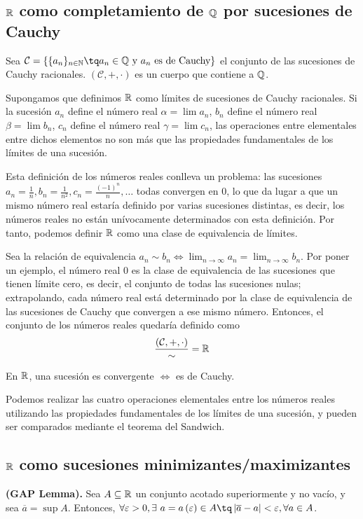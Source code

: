 {\subsection{$\mathbb{R}$ como completamiento de $\mathbb{Q}$ por sucesiones de Cauchy}
Sea $\mathcal{C} = \{\{a_n\}_{n\in\N}\tq a_n\in\Q \textrm{ y $a_n$ es de Cauchy} \}$ el conjunto de las sucesiones de Cauchy racionales. $\left(\mathcal{C}, +, \cdot\right)$ es un cuerpo que contiene a $\mathbb{Q}$.

Supongamos que definimos $\mathbb{R}$ como límites de sucesiones de Cauchy racionales. Si la sucesión $a_n$ define el número real $\alpha = \lim a_n$, $b_n$ define el número real $\beta = \lim b_n$, $c_n$ define el número real $\gamma = \lim c_n$, las operaciones entre elementales entre dichos elementos no son más que las propiedades fundamentales de los límites de una sucesión.

Esta definición de los números reales conlleva un problema: las sucesiones $a_n = \frac{1}{n}, b_n = \frac{1}{n^2}, c_n = \frac{\left(-1\right)^n}{n}, \ldots$ todas convergen en $0$, lo que da lugar a que un mismo número real estaría definido por varias sucesiones distintas, es decir, los números reales no están unívocamente determinados con esta definición. Por tanto, podemos definir $\mathbb{R}$ como una clase de equivalencia de límites.

Sea la relación de equivalencia $a_n\sim b_n \iff\lim_{n\to\infty}a_n = \lim_{n\to\infty}b_n$. Por poner un ejemplo, el número real $0$ es la clase de equivalencia de las sucesiones que tienen límite cero, es decir, el conjunto de todas las sucesiones nulas; extrapolando, cada número real está determinado por la clase de equivalencia de las sucesiones de Cauchy que convergen a ese mismo número. Entonces, el conjunto de los números reales quedaría definido como
\begin{equation}
    \frac{\left(\mathcal{C}, +, \cdot \right)}{\sim} = \mathbb{R}
\end{equation}

\begin{coro}
    En $\mathbb{R}$, una sucesión es convergente $\iff$ es de Cauchy.
\end{coro}

Podemos realizar las cuatro operaciones elementales entre los números reales utilizando las propiedades fundamentales de los límites de una sucesión, y pueden ser comparados mediante el teorema del Sandwich.

\subsection{$\mathbb{R}$ como sucesiones minimizantes/maximizantes}
\begin{lemma}
    \textbf{(GAP Lemma).} Sea $A\subseteq\mathbb{R}$ un conjunto acotado superiormente y no vacío, y sea $\overline{a} = \sup A$. Entonces, $\forall\epsilon > 0, \exists\ a = a\left( \epsilon \right) \in A\tq \abs{\overline{a} - a} < \epsilon, \forall a\in A$.
\end{lemma}

}
